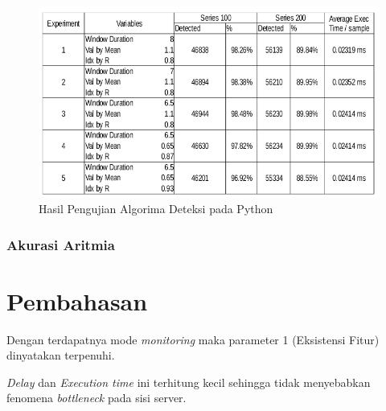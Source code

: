 \begin{figure}[H]
	\centering
	\includegraphics[scale=0.5]{images/exec_time3.png}
	\caption{Hasil Pengujian Algorima Deteksi pada Python}
	\label{fig:exec_time3}
\end{figure}

\subsubsection{Akurasi Aritmia}

\section{Pembahasan}
Dengan terdapatnya mode \textit{monitoring} maka parameter 1 (Eksistensi Fitur) dinyatakan terpenuhi.


\textit{Delay} dan \textit{Execution time} ini terhitung kecil sehingga tidak menyebabkan fenomena \textit{bottleneck} pada sisi server.